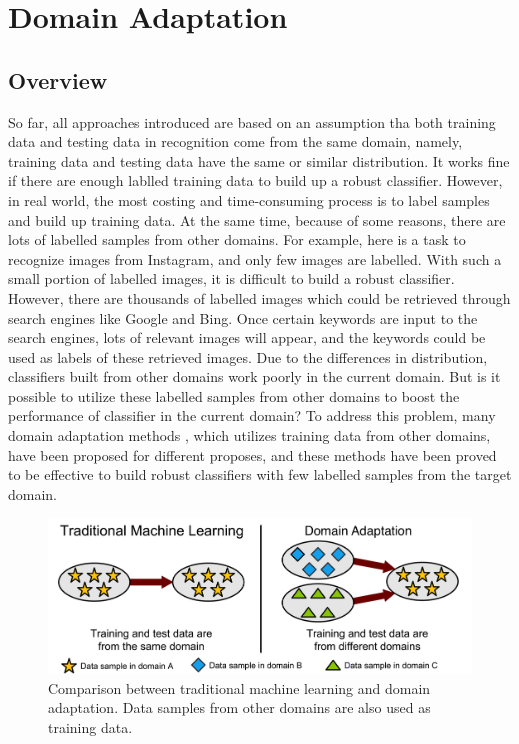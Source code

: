\section{Domain Adaptation}
\subsection{Overview}
So far, all approaches introduced are based on an assumption tha both training data and testing data in recognition come from the same domain, namely, training data and testing data have the same or similar distribution. It works fine if there are enough lablled training data to build up a robust classifier. However, in real world, the most costing and time-consuming process is to label samples and build up training data. At the same time, because of some reasons, there are lots of labelled samples from other domains. For example, here is a task to recognize images from Instagram, and only few images are labelled. With such a small portion of labelled images, it is difficult to build a robust classifier. However, there are thousands of labelled images which could be retrieved through search engines like Google and Bing. Once certain keywords are input to the search engines, lots of relevant images will appear, and the keywords could be used as labels of these retrieved images. Due to the differences in distribution, classifiers built from other domains work poorly in the current domain. But is it possible to utilize these labelled samples from other domains to boost the performance of classifier in the current domain? To address this problem, many domain adaptation methods \cite{daume2007frustratingly, yang2007cross, duan2009domain, duan2012visual}, which utilizes training data from other domains, have been proposed for different proposes, and these methods have been proved to be effective to build robust classifiers with few labelled samples from the target domain. \\


\begin{figure}[!ht]
\centering
  \includegraphics[width=1\textwidth]{./domainAdaption.png}
\caption{Comparison between traditional machine learning and domain adaptation. Data samples from other domains are also used as training data.}
\end{figure}

